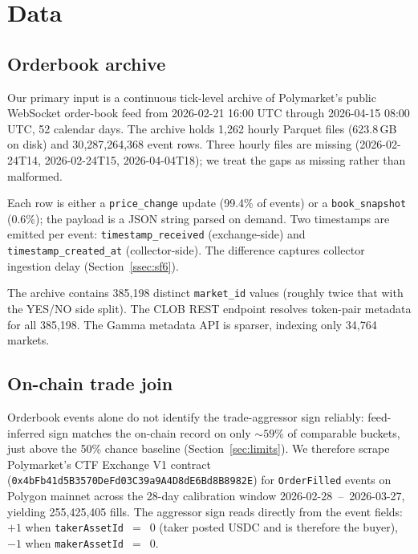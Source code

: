 \section{Data}\label{sec:data}

\subsection{Orderbook archive}
\label{ssec:orderbook-archive}

Our primary input is a continuous tick-level archive of Polymarket's
public WebSocket order-book feed from 2026-02-21 16:00 UTC through
2026-04-15 08:00 UTC, 52 calendar days. The archive holds 1{,}262
hourly Parquet files (623.8\,GB on disk) and 30{,}287{,}264{,}368
event rows. Three hourly files are missing
(2026-02-24T14, 2026-02-24T15, 2026-04-04T18); we treat the gaps as
missing rather than malformed.

Each row is either a \texttt{price\_change} update (99.4\% of events)
or a \texttt{book\_snapshot} (0.6\%); the payload is a JSON string
parsed on demand. Two timestamps are emitted per event:
\texttt{timestamp\_received} (exchange-side) and
\texttt{timestamp\_created\_at} (collector-side). The difference
captures collector ingestion delay (Section~\ref{ssec:sf6}).

The archive contains 385{,}198 distinct \texttt{market\_id} values
(roughly twice that with the YES/NO side split). The CLOB REST
endpoint resolves token-pair metadata for all 385{,}198. The Gamma
metadata API is sparser, indexing only 34{,}764 markets.

\subsection{On-chain trade join}
\label{ssec:onchain-join}

Orderbook events alone do not identify the trade-aggressor sign
reliably: feed-inferred sign matches the on-chain record on only
$\sim 59\%$ of comparable buckets, just above the 50\% chance
baseline (Section~\ref{sec:limits}). We therefore scrape Polymarket's
CTF Exchange V1 contract
(\texttt{0x4bFb41d5\allowbreak B3570DeFd03\allowbreak C39a9A4D8dE6Bd8\allowbreak B8982E})
for \texttt{OrderFilled} events on Polygon mainnet across the 28-day
calibration window 2026-02-28~--~2026-03-27, yielding 255{,}425{,}405
fills. The aggressor sign reads directly from the event fields: $+1$
when \texttt{takerAssetId}~$=$~0 (taker posted USDC and is therefore
the buyer), $-1$ when \texttt{makerAssetId}~$=$~0.

